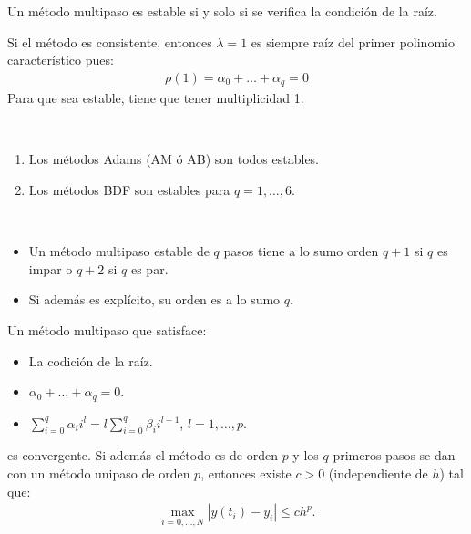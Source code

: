 \begin{teo}
Un método multipaso es estable si y solo si se verifica la condición de la raíz.
\end{teo}

\begin{obs}
Si el método es consistente, entonces $\lambda = 1$ es siempre raíz del primer polinomio característico pues:
\begin{align*}
    \rho(1) = \alpha_0 + \ldots + \alpha_q = 0
\end{align*}
Para que sea estable, tiene que tener multiplicidad 1.
\end{obs}

\begin{ejemplo} \
\begin{enumerate}
    \item Los métodos Adams (AM ó AB) son todos estables.
    \item Los métodos BDF son estables para $q = 1,\ldots,6$.
\end{enumerate}
\end{ejemplo}

\begin{teo} \
\begin{itemize}
    \item Un método multipaso estable de $q$ pasos tiene a lo sumo orden $q+1$ si $q$ es impar o $q+2$ si $q$ es par.
    \item Si además es explícito, su orden es a lo sumo $q$.
\end{itemize}
\end{teo}

\begin{teo}
Un método multipaso que satisface:
\begin{itemize}
    \item La codición de la raíz.
    \item $\alpha_0 + \ldots + \alpha_q = 0$.
    \item $\sum_{i=0}^{q} \alpha_i i^l = l\sum_{i=0}^{q} \beta_i i^{l-1}$, $l = 1,\ldots,p$. 
\end{itemize}
es convergente. Si además el método es de orden $p$ y los $q$ primeros pasos se dan con un método unipaso de orden $p$, entonces existe $c > 0$ (independiente de $h$) tal que:
\begin{align*}
    \max_{i=0,\ldots,N} |y(t_i) - y_i| \leq ch^p.
\end{align*}
\end{teo}